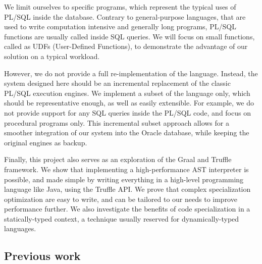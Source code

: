 \documentclass[twoside,11pt,a4paper]{article}
\begin{document}
We limit ourselves to specific programs, which represent the typical uses of PL/SQL inside the database. Contrary to general-purpose languages, that are used to write computation intensive and generally long programs, PL/SQL functions are usually called inside SQL queries. We will focus on small functions, called as UDFs (User-Defined Functions), to demonstrate the advantage of our solution on a typical workload.


However, we do not provide a full re-implementation of the language. Instead, the system designed here should be an incremental replacement of the classic PL/SQL execution engines. We implement a subset of the language only, which should be representative enough, as well as easily extensible. For example, we do not provide support for any SQL queries inside the PL/SQL code, and focus on procedural programs only. This incremental subset approach allows for a smoother integration of our system into the Oracle database, while keeping the original engines as backup.

Finally, this project also serves as an exploration of the Graal and Truffle framework. We show that implementing a high-performance AST interpreter is possible, and made simple by writing everything in a high-level programming language like Java, using the Truffle API. We prove that complex specialization optimization are easy to write, and can be tailored to our needs to improve performance further. We also investigate the benefits of code specialization in a statically-typed context, a technique usually reserved for dynamically-typed languages.

\subsection{Previous work}
\end{document}
